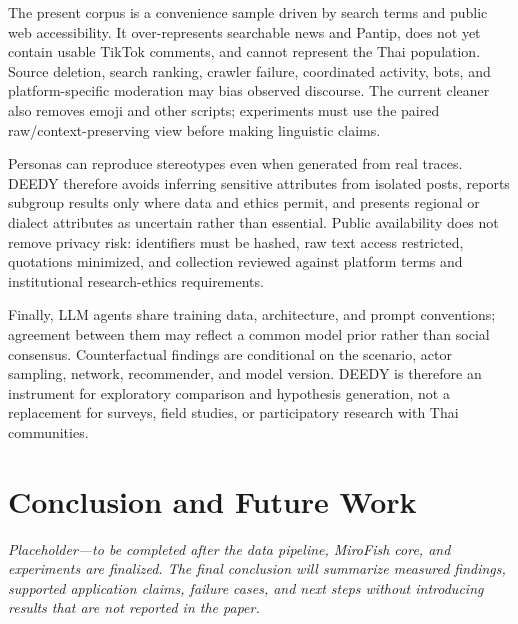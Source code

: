 \documentclass[conference]{IEEEtran}
\begin{document}
The present corpus is a convenience sample driven by search terms and public
web accessibility. It over-represents searchable news and Pantip, does not yet
contain usable TikTok comments, and cannot represent the Thai population.
Source deletion, search ranking, crawler failure, coordinated activity, bots,
and platform-specific moderation may bias observed discourse. The current
cleaner also removes emoji and other scripts; experiments must use the paired
raw/context-preserving view before making linguistic claims.

Personas can reproduce stereotypes even when generated from real traces.
DEEDY therefore avoids inferring sensitive attributes from isolated posts,
reports subgroup results only where data and ethics permit, and presents
regional or dialect attributes as uncertain rather than essential. Public
availability does not remove privacy risk: identifiers must be hashed, raw
text access restricted, quotations minimized, and collection reviewed against
platform terms and institutional research-ethics requirements.

Finally, LLM agents share training data, architecture, and prompt conventions;
agreement between them may reflect a common model prior rather than social
consensus. Counterfactual findings are conditional on the scenario, actor
sampling, network, recommender, and model version. DEEDY is therefore an
instrument for exploratory comparison and hypothesis generation, not a
replacement for surveys, field studies, or participatory research with Thai
communities.

\section{Conclusion and Future Work}

\emph{Placeholder---to be completed after the data pipeline, MiroFish core,
and experiments are finalized. The final conclusion will summarize measured
findings, supported application claims, failure cases, and next steps without
introducing results that are not reported in the paper.}



\end{document}
